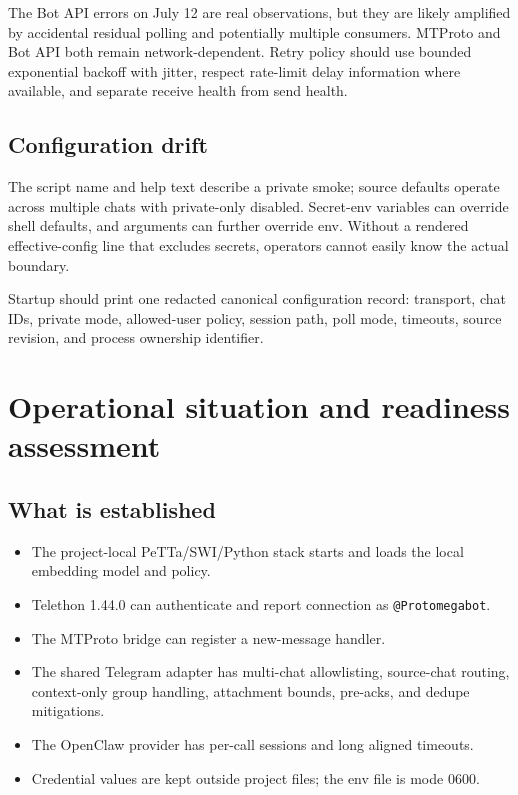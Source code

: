\documentclass[10pt]{article}
\newcommand{\code}[1]{\texttt{#1}}
\begin{document}
The Bot API errors on July 12 are real observations, but they are likely amplified by accidental residual polling and potentially multiple consumers. MTProto and Bot API both remain network-dependent. Retry policy should use bounded exponential backoff with jitter, respect rate-limit delay information where available, and separate receive health from send health.

\subsection{Configuration drift}

The script name and help text describe a private smoke; source defaults operate across multiple chats with private-only disabled. Secret-env variables can override shell defaults, and arguments can further override env. Without a rendered effective-config line that excludes secrets, operators cannot easily know the actual boundary.

Startup should print one redacted canonical configuration record: transport, chat IDs, private mode, allowed-user policy, session path, poll mode, timeouts, source revision, and process ownership identifier.

\section{Operational situation and readiness assessment}

\subsection{What is established}

\begin{itemize}
  \item The project-local PeTTa/SWI/Python stack starts and loads the local embedding model and policy.
  \item Telethon 1.44.0 can authenticate and report connection as \code{@Protomegabot}.
  \item The MTProto bridge can register a new-message handler.
  \item The shared Telegram adapter has multi-chat allowlisting, source-chat routing, context-only group handling, attachment bounds, pre-acks, and dedupe mitigations.
  \item The OpenClaw provider has per-call sessions and long aligned timeouts.
  \item Credential values are kept outside project files; the env file is mode 0600.
\end{itemize}
\end{document}
